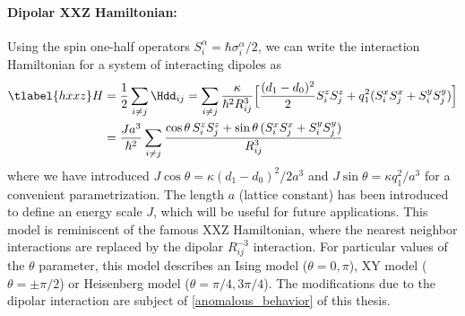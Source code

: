 \paragraph{Dipolar XXZ Hamiltonian:}
Using the spin one-half operators $S^\alpha_i = \hbar \sigma^\alpha_i/2$, we can write the interaction Hamiltonian for a system of interacting dipoles as
\begin{align} \tlabel{hxxz}
    H &= \frac{1}{2} \sum_{i\ne j} \Hdd_{ij} = \sum_{i\ne j} \frac{\kappa}{\hbar^2 R_{ij}^3} \Big[ \frac{(d_1-d_0)^2}{2} S^z_i S^z_j  + q_1^2 (S^x_i S^x_j + S^y_i S^y_j) \Big] \\
         &= \frac{Ja^3}{\hbar^2} \sum_{i\ne j} \frac{\cos\theta\, S^z_i S^z_j  + \sin\theta\, (S^x_i S^x_j + S^y_i S^y_j)}{R_{ij}^3}
\end{align}
where we have introduced $J\cos\theta = \kappa (d_1-d_0)^2/2a^3$ and $J\sin\theta = \kappa q_1^2/a^3$ for a convenient parametrization.
The length $a$ (lattice constant) has been introduced to define an energy scale $J$, which will be useful for future applications.
This model is reminiscent of the famous XXZ Hamiltonian, where the nearest neighbor interactions are replaced by the dipolar $R_{ij}^{-3}$ interaction. For particular values of the $\theta$ parameter, this model describes an Ising model ($\theta = 0, \pi$), XY model ($\theta=\pm \pi/2$) or Heisenberg model ($\theta=\pi/4, 3\pi/4$). The modifications due to the dipolar interaction are subject of \cref{anomalous_behavior} of this thesis.

